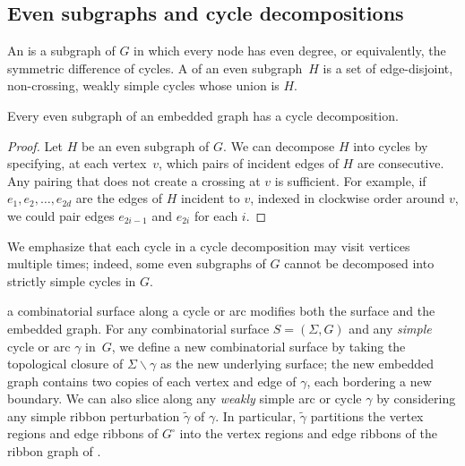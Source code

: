 \documentclass[letterpaper,review]{siamart190516}
\def\snip{\mathbin{\raisebox{0.15ex}{\rotatebox[origin=c]{60}{\Rightscissors}\!}}}
\def\snip{\mathbin{\backslash\!\!\backslash}}
\def\rnote#1{\color{red}Review: #1 \color{black}}
\begin{document}

\subsection{Even subgraphs and cycle decompositions}
An  is a subgraph of $G$ in which every node has even degree, or equivalently, the symmetric difference of cycles.
A  of an even subgraph~$H$ is a set of edge-disjoint, non-crossing, weakly simple cycles whose union is $H$.

\begin{lemma}
\label{lem:decomposition}
Every even subgraph of an embedded graph has a cycle decomposition.
\end{lemma}

\begin{proof}
Let $H$ be an even subgraph of $G$.  We can decompose $H$ into cycles by specifying, at each vertex~$v$, which pairs of incident edges of $H$ are consecutive.  Any pairing that does not create a crossing at $v$ is sufficient.  For example, if $e_1, e_2, \dots, e_{2d}$ are the edges of $H$ incident to $v$, indexed in clockwise order around $v$, we could pair edges $e_{2i-1}$ and $e_{2i}$ for each $i$.
\end{proof}

We emphasize that each cycle in a cycle decomposition may visit vertices multiple times; indeed, some even subgraphs of $G$ cannot be decomposed into strictly simple cycles in $G$.

 a combinatorial surface along a cycle or arc modifies both the surface and the embedded graph.  For any combinatorial surface $S = (\Sigma, G)$ and any \emph{simple} cycle or arc $\gamma$ in~$G$, we define a new combinatorial surface \EMPH{$S \snip \gamma$} by taking the topological closure of $\Sigma \backslash \gamma$ as the new underlying surface; the new embedded graph contains two copies of each vertex and edge of $\gamma$, each bordering a new boundary.  We can also slice along any \emph{weakly} simple arc or cycle $\gamma$ by considering any simple ribbon perturbation $\tilde\gamma$ of $\gamma$.  In particular, $\tilde\gamma$ partitions the vertex regions and edge ribbons of $G^\square$ into the vertex regions and edge ribbons of the ribbon graph of \EMPH{$S \snip \gamma$}.
\end{document}
